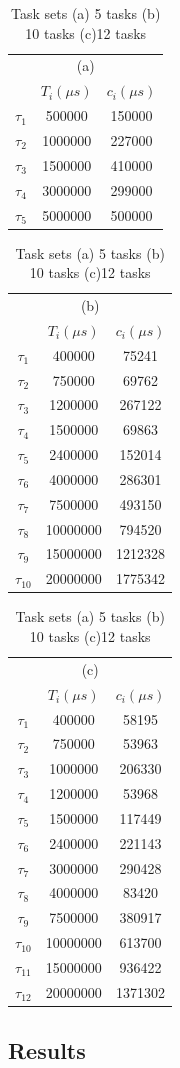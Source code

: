 \documentclass[conference]{sig-alternate}
\providecommand{\tabularnewline}{\\}
\begin{document}
\begin{table}
\caption{\label{tab:Task-set-1}Task sets (a) \label{tab:Task-sets-(a)}5 tasks
\label{tab:Task-sets-(b)}(b) 10 tasks \label{tab:Task-sets-(c)}(c)12
tasks}


\centering{}\begin{tabular}{|c|c|c|}
\multicolumn{3}{c}{(a)}\tabularnewline
\cline{2-3} 
\multicolumn{1}{c|}{} & $T_{i}(\mu s)$ & $c_{i}(\mu s)$\tabularnewline
\hline 
$\tau_{1}$ & 500000 & 150000\tabularnewline
\hline 
$\tau_{2}$ & 1000000 & 227000\tabularnewline
\hline 
$\tau_{3}$ & 1500000 & 410000\tabularnewline
\hline 
$\tau_{4}$ & 3000000 & 299000\tabularnewline
\hline 
$\tau_{5}$ & 5000000 & 500000\tabularnewline
\hline
\end{tabular} \begin{tabular}{|c|c|c|}
\multicolumn{3}{c}{(b)}\tabularnewline
\cline{2-3} 
\multicolumn{1}{c|}{} & $T_{i}(\mu s)$ & $c_{i}(\mu s)$\tabularnewline
\hline 
$\tau_{1}$ & 400000 & 75241\tabularnewline
\hline 
$\tau_{2}$ & 750000 & 69762\tabularnewline
\hline 
$\tau_{3}$ & 1200000 & 267122\tabularnewline
\hline 
$\tau_{4}$ & 1500000 & 69863\tabularnewline
\hline 
$\tau_{5}$ & 2400000 & 152014\tabularnewline
\hline 
$\tau_{6}$ & 4000000 & 286301\tabularnewline
\hline 
$\tau_{7}$ & 7500000 & 493150\tabularnewline
\hline 
$\tau_{8}$ & 10000000 & 794520\tabularnewline
\hline 
$\tau_{9}$ & 15000000 & 1212328\tabularnewline
\hline 
$\tau_{10}$ & 20000000 & 1775342\tabularnewline
\hline
\end{tabular} \begin{tabular}{|c|c|c|}
\multicolumn{3}{c}{(c)}\tabularnewline
\cline{2-3} 
\multicolumn{1}{c|}{} & $T_{i}(\mu s)$ & $c_{i}(\mu s)$\tabularnewline
\hline 
$\tau_{1}$ & 400000 & 58195\tabularnewline
\hline 
$\tau_{2}$ & 750000 & 53963\tabularnewline
\hline 
$\tau_{3}$ & 1000000 & 206330\tabularnewline
\hline 
$\tau_{4}$ & 1200000 & 53968\tabularnewline
\hline 
$\tau_{5}$ & 1500000 & 117449\tabularnewline
\hline 
$\tau_{6}$ & 2400000 & 221143\tabularnewline
\hline 
$\tau_{7}$ & 3000000 & 290428\tabularnewline
\hline 
$\tau_{8}$ & 4000000 & 83420\tabularnewline
\hline 
$\tau_{9}$ & 7500000 & 380917\tabularnewline
\hline 
$\tau_{10}$ & 10000000 & 613700\tabularnewline
\hline 
$\tau_{11}$ & 15000000 & 936422\tabularnewline
\hline 
$\tau_{12}$ & 20000000 & 1371302\tabularnewline
\hline
\end{tabular}
\end{table}

\subsection{Results}
\end{document}
